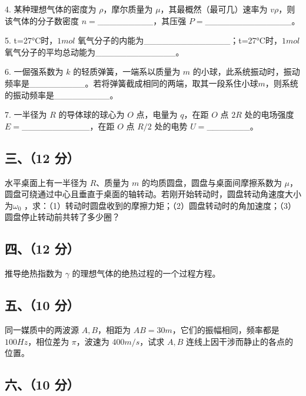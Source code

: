 4. 某种理想气体的密度为 $\rho$，摩尔质量为 $\mu$，其最概然（最可几）速率为 $v\rho$，则该气体的分子数密度 $n=$_________，其压强 $P=$______________。

5. t=27°C时，$1mol$ 氧气分子的内能为______________；t=27°C时，$1mol$ 氧气分子的平均总动能为_____________。

6. 一倔强系数为 $k$ 的轻质弹簧，一端系以质量为 $m$ 的小球，此系统振动时，振动频率是_________。若将弹簧截成相同的两端，取其一段系住小球$m$，则系统的振动频率是_________。

7. 一半径为 $R$ 的导体球的球心为 $O$ 点，电量为 $q$，在距 $O$ 点 $2R$ 处的电场强度$E=$___________，在距 $O$ 点 $R/2$ 处的电势 $U=$_______。
\subsection{三、（12 分）}
水平桌面上有一半径为 $R$、质量为 $m$ 的均质圆盘，圆盘与桌面间摩擦系数为 $\mu$，圆盘可绕通过中心且垂直于桌面的轴转动。若刚开始转动时，圆盘转动角速度大小为$\omega_0$ ，求：（1）转动时圆盘收到的摩擦力矩；（2）圆盘转动时的角加速度；（3）圆盘停止转动前共转了多少圈？
\subsection{四、（12 分）}
推导绝热指数为 $ \gamma $ 的理想气体的绝热过程的一个过程方程。
\subsection{五、（10 分）}
同一媒质中的两波源 $A,B$，相距为 $AB=30m$，它们的振幅相同，频率都是 $100Hz$，相位差为 $\pi$，波速为 $400m/s$，试求 $A,B$ 连线上因干涉而静止的各点的位置。
\subsection{六、（10 分）}
